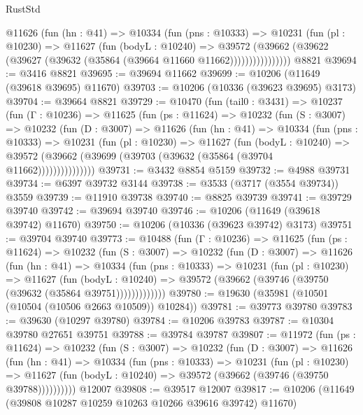 \begin{lexlean}{RustStd}
\begin{coremodule}
              @11626
                (fun (hn : @41) =>
                @10334
                  (fun (pns : @10333) =>
                  @10231
                    (fun (pl : @10230) =>
                    @11627
                      (fun (bodyL : @10240) =>
                      @39572
                        (@39662
                          (@39622 (@39627 (@39632 (@35864 (@39664 @11660 @11662))))))))))))))))
    @8821
@39694 := @3416 @8821
@39695 := @39694 @11662
@39699 := @10206 (@11649 (@39618 @39695) @11670)
@39703 := @10206 (@10336 (@39623 @39695) @3173)
@39704 := @39664 @8821
@39729 := @10470
    (fun (tail0 : @3431) =>
    @10237
      (fun (Γ : @10236) =>
      @11625
        (fun (ps : @11624) =>
        @10232
          (fun (S : @3007) =>
          @10232
            (fun (D : @3007) =>
            @11626
              (fun (hn : @41) =>
              @10334
                (fun (pns : @10333) =>
                @10231
                  (fun (pl : @10230) =>
                  @11627
                    (fun (bodyL : @10240) =>
                    @39572 (@39662 (@39699 (@39703 (@39632 (@35864 (@39704 @11662)))))))))))))))
@39731 := @3432 @8854 @5159
@39732 := @4988 @39731
@39734 := @6397 @39732 @3144
@39738 := @3533 (@3717 (@3554 @39734)) @3559
@39739 := @11910 @39738
@39740 := @8825 @39739
@39741 := @39729 @39740
@39742 := @39694 @39740
@39746 := @10206 (@11649 (@39618 @39742) @11670)
@39750 := @10206 (@10336 (@39623 @39742) @3173)
@39751 := @39704 @39740
@39773 := @10488
    (fun (Γ : @10236) =>
    @11625
      (fun (ps : @11624) =>
      @10232
        (fun (S : @3007) =>
        @10232
          (fun (D : @3007) =>
          @11626
            (fun (hn : @41) =>
            @10334
              (fun (pns : @10333) =>
              @10231
                (fun (pl : @10230) =>
                @11627
                  (fun (bodyL : @10240) =>
                  @39572 (@39662 (@39746 (@39750 (@39632 (@35864 @39751)))))))))))))
@39780 := @19630 (@35981 (@10501 (@10504 (@10506 @2663 @10509)) @10284))
@39781 := @39773 @39780
@39783 := @39630 (@10297 @39780)
@39784 := @10206 @39783
@39787 := @10304 @39780 @27651 @39751
@39788 := @39784 @39787
@39807 := @11972
    (fun (ps : @11624) =>
    @10232
      (fun (S : @3007) =>
      @10232
        (fun (D : @3007) =>
        @11626
          (fun (hn : @41) =>
          @10334
            (fun (pns : @10333) =>
            @10231
              (fun (pl : @10230) =>
              @11627 (fun (bodyL : @10240) => @39572 (@39662 (@39746 (@39750 @39788))))))))))
    @12007
@39808 := @39517 @12007
@39817 := @10206 (@11649 (@39808 @10287 @10259 @10263 @10266 @39616 @39742) @11670)

\end{coremodule}
\end{lexlean}

